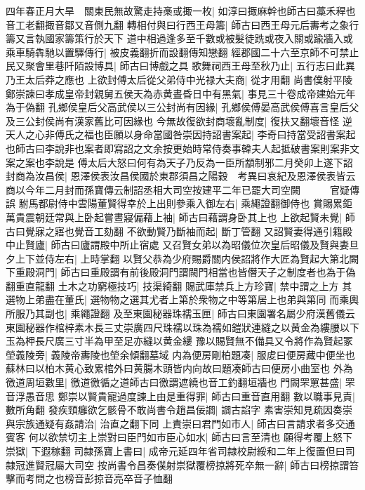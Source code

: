 四年春正月大旱　關東民無故驚走持槀或掫一枚|{
	如淳曰掫麻幹也師古曰藁禾稈也音工老翻掫音鄒又音側九翻}
轉相付與曰行西王母籌|{
	師古曰西王母元后夀考之象行籌又言執國家籌策行於天下}
道中相過逢多至千數或被髮徒跣或夜入關或踰牆入或乘車騎犇馳以置驛傳行|{
	被皮義翻折而設翻傳知戀翻}
經郡國二十六至京師不可禁止民又聚會里巷阡陌設博具|{
	師古曰博戲之具}
歌舞祠西王母至秋乃止|{
	五行志曰此異乃王太后莽之應也}
上欲封傅太后從父弟侍中光禄大夫商|{
	從才用翻}
尚書僕射平陵鄭崇諫曰孝成皇帝封親舅五侯天為赤黄晝昏日中有黑氣|{
	事見三十卷成帝建始元年為于偽翻}
孔鄉侯皇后父高武侯以三公封尚有因緣|{
	孔鄉侯傅晏高武侯傅喜言皇后父及三公封侯尚有漢家舊比可因緣也}
今無故復欲封商壞亂制度|{
	復扶又翻壞音怪}
逆天人之心非傅氏之福也臣願以身命當國咎崇因持詔書案起|{
	李奇曰持當受詔書案起也師古曰李說非也案者即寫詔之文余按更始時常侍奏事韓夫人起抵破書案則案非文案之案也李說是}
傅太后大怒曰何有為天子乃反為一臣所顓制邪二月癸卯上遂下詔封商為汝昌侯|{
	恩澤侯表汝昌侯國於東郡須昌之陽穀　考異曰哀紀及恩澤侯表皆云商以今年二月封而孫寶傳云制詔丞相大司空按建平二年已罷大司空闕　　　官疑傳誤}
駙馬都尉侍中雲陽董賢得幸於上出則參乘入御左右|{
	乘繩證翻御侍也}
賞賜累鉅萬貴震朝廷常與上卧起嘗晝寢偏藉上袖|{
	師古曰藉謂身卧其上也}
上欲起賢未覺|{
	師古曰覺寐之寤也覺音工劾翻}
不欲動賢乃斷袖而起|{
	斷丁管翻}
又詔賢妻得通引籍殿中止賢廬|{
	師古曰廬謂殿中所止宿處}
又召賢女弟以為昭儀位次皇后昭儀及賢與妻旦夕上下並侍左右|{
	上時掌翻}
以賢父恭為少府賜爵關内侯詔將作大匠為賢起大第北闕下重殿洞門|{
	師古曰重殿謂有前後殿洞門謂闕門相當也皆僭天子之制度者也為于偽翻重直龍翻}
土木之功窮極技巧|{
	技渠綺翻}
賜武庫禁兵上方珍寶|{
	禁中謂之上方}
其選物上弟盡在董氏|{
	選物物之選其尤者上第於衆物之中等第居上也弟與第同}
而乘輿所服乃其副也|{
	乘繩證翻}
及至東園秘器珠襦玉匣|{
	師古曰東園署名屬少府漢舊儀云東園秘器作棺梓素木長三丈崇廣四尺珠襦以珠為襦如鎧狀連縫之以黄金為縷腰以下玉為柙長尺廣三寸半為甲至足亦縫以黄金縷}
豫以賜賢無不備具又令將作為賢起冢塋義陵旁|{
	義陵帝夀陵也塋余傾翻墓域}
内為便房剛柏題凑|{
	服䖍曰便房藏中便坐也蘇林曰以柏木黄心致累棺外曰黄腸木頭皆内向故曰題凑師古曰便房小曲室也}
外為徼道周垣數里|{
	徼道徼循之道師古曰徼謂遮繞也音工釣翻垣牆也}
門闕罘罳甚盛|{
	罘音浮愚音思}
鄭崇以賢貴寵過度諫上由是重得罪|{
	師古曰重音直用翻}
數以職事見責|{
	數所角翻}
發疾頸癰欲乞骸骨不敢尚書令趙昌佞讇|{
	讇古諂字}
素害崇知見疏因奏崇與宗族通疑有姦請治|{
	治直之翻下同}
上責崇曰君門如市人|{
	師古曰言請求者多交通賓客}
何以欲禁切主上崇對曰臣門如市臣心如水|{
	師古曰言至清也}
願得考覆上怒下崇獄|{
	下遐稼翻}
司隸孫寶上書曰|{
	成帝元延四年省司隸校尉綏和二年上復置但曰司隸冠進賢冠屬大司空}
按尚書令昌奏僕射崇獄覆榜掠將死卒無一辭|{
	師古曰榜掠謂笞擊而考問之也榜音彭掠音亮卒音子恤翻}
